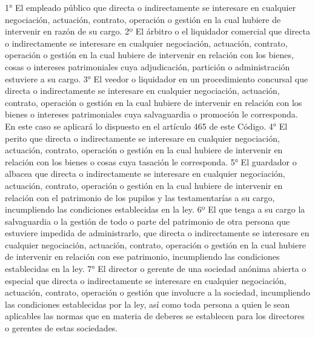     1° El empleado público que directa o indirectamente se interesare en cualquier negociación, actuación, contrato, operación o gestión en la cual hubiere de intervenir en razón de su cargo.
    2º El árbitro o el liquidador comercial que directa o indirectamente se interesare en cualquier negociación, actuación, contrato, operación o gestión en la cual hubiere de intervenir en relación con los bienes, cosas o intereses patrimoniales cuya adjudicación, partición o administración estuviere a su cargo.
    3° El veedor o liquidador en un procedimiento concursal que directa o indirectamente se interesare en cualquier negociación, actuación, contrato, operación o gestión en la cual hubiere de intervenir en relación con los bienes o intereses patrimoniales cuya salvaguardia o promoción le corresponda.
    En este caso se aplicará lo dispuesto en el artículo 465 de este Código.
    4° El perito que directa o indirectamente se interesare en cualquier negociación, actuación, contrato, operación o gestión en la cual hubiere de intervenir en relación con los bienes o cosas cuya tasación le corresponda.
    5° El guardador o albacea que directa o indirectamente se interesare en cualquier negociación, actuación, contrato, operación o gestión en la cual hubiere de intervenir en relación con el patrimonio de los pupilos y las testamentarías a su cargo, incumpliendo las condiciones establecidas en la ley.
    6º El que tenga a su cargo la salvaguardia o la gestión de todo o parte del patrimonio de otra persona que estuviere impedida de administrarlo, que directa o indirectamente se interesare en cualquier negociación, actuación, contrato, operación o gestión en la cual hubiere de intervenir en relación con ese patrimonio, incumpliendo las condiciones establecidas en la ley.
    7° El director o gerente de una sociedad anónima abierta o especial que directa o indirectamente se interesare en cualquier negociación, actuación, contrato, operación o gestión que involucre a la sociedad, incumpliendo las condiciones establecidas por la ley, así como toda persona a quien le sean aplicables las normas que en materia de deberes se establecen para los directores o gerentes de estas sociedades.
   
